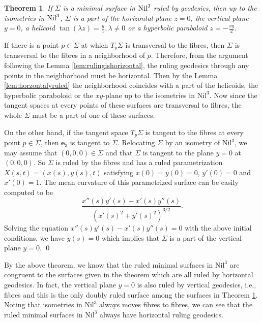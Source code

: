 \documentclass[11pt]{amsart}
\newtheorem{thm}[prop]{Theorem}
\begin{document}
\begin{thm}\label{thm:ruledmin}
If $\Sigma$ is a minimal surface in $\text{\rm Nil}^3$ ruled by
geodesics, then up to the isometries in $\text{\rm Nil}^3$,
$\Sigma$ is a part of the horizontal plane $z=0$, the vertical
plane $y=0$, a helicoid $\tan(\lambda z)=\frac{y}{x}, \lambda\ne0$
or a hyperbolic paraboloid $z=-\frac{xy}2.$
\end{thm}

\noindent[Proof] If there is a point $p\in \Sigma$ at which
$T_p\Sigma$ is transversal to the fibres, then $\Sigma$ is
transversal to the fibres in a neighborhood of $p$. Therefore,
from the argument following the Lemma
{\ref{lem:rulingishorizontal}}, the ruling geodesics through any
points in the neighborhood must be horizontal. Then by the Lemma
\ref{lem:horzontalyruled} the neighborhood coincides with a part
of the helicoids, the hyperbolic paraboloid or the $xy$-plane up
to the isometries in $\text{Nil}^3$. Now since the tangent spaces
at every points of these surfaces are transversal to fibres, the
whole $\Sigma$ must be a part of one of these surfaces.

  On the other hand, if the tangent space $T_p \Sigma$ is tangent
to the fibres at every point $p\in \Sigma$, then ${\mathbf{e}}_3$ is
tangent to $\Sigma$. Relocating $\Sigma$ by an isometry of
$\text{Nil}^3$, we may assume that $(0,0,0)\in\Sigma$ and that
$\Sigma$ is tangent to the plane $y=0$ at $(0,0,0)$. So $\Sigma$
is ruled by the fibres and has a ruled parametrization $ X(s,t) =(
x(s), y(s), t)$ satisfying $x(0)=y(0)=0$, $y'(0)=0$ and $x'(0)=1$.
The mean curvature of this parametrized surface can be easily
computed to be
\[  \frac{x''(s)y'(s)-x'(s)y''(s)}{ (x'(s)^2 +y'(s)^2 )^{3/2}}.
\]
Solving the equation $x''(s)y'(s)-x'(s)y''(s)=0$ with the above initial conditions, we have $y(s)=0$ which implies that $\Sigma$ is a part of the vertical plane $y=0$.
\qed

\medskip

By the above theorem, we know that the ruled minimal surfaces in
$\text{Nil}^3$ are congruent to the surfaces given in the theorem
which are all ruled by horizontal geodesics. In fact, the vertical
plane $y=0$ is also ruled by vertical geodesics, i.e., fibres and
this is the only doubly ruled surface among the surfaces in
Theorem {\ref{thm:ruledmin}}. Noting that isometries in
$\text{Nil}^3$ always moves fibres to fibres, we can see that the
ruled minimal surfaces in $\text{Nil}^3$ always have horizontal
ruling geodesics.  \par
\end{document}
